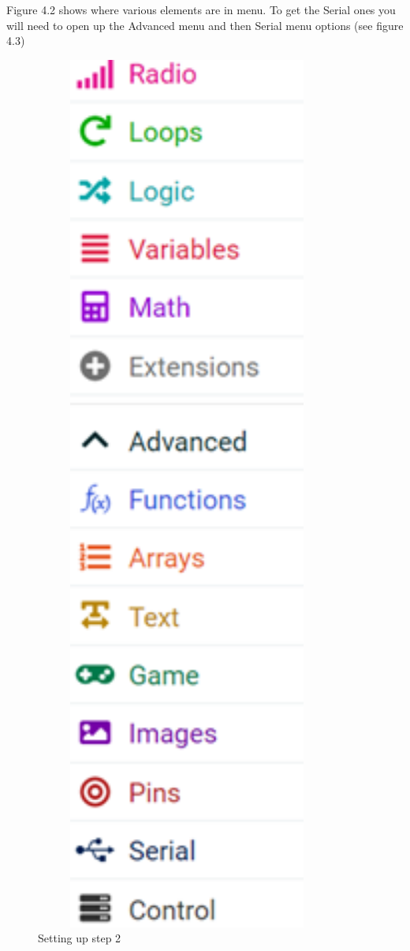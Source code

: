 Figure 4.2 shows where various elements are in menu. To get the Serial ones you will need to open up the Advanced menu and then Serial menu options (see figure 4.3)
\begin{figure}
    \centering
    \includegraphics[width=10cm]{chapters/ChapterP2-datalog/figures/datalog3.png}
    \caption{Setting up step 2}
    \label{fig:datalogstep2}
\end{figure}
 

